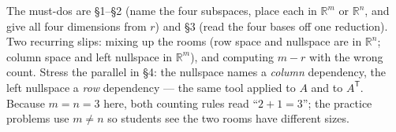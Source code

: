 \documentclass[10pt]{article}
\newcommand{\T}{\mathsf{T}}
\begin{document}
\begin{teachernote}
The must-dos are \S1--\S2 (name the four subspaces, place each in $\mathbb{R}^m$ or $\mathbb{R}^n$, and give
all four dimensions from $r$) and \S3 (read the four bases off one reduction). Two recurring slips: mixing
up the rooms (row space and nullspace are in $\mathbb{R}^n$; column space and left nullspace in
$\mathbb{R}^m$), and computing $m-r$ with the wrong count. Stress the parallel in \S4: the nullspace names a
\emph{column} dependency, the left nullspace a \emph{row} dependency --- the same tool applied to $A$ and to
$A^{\T}$. Because $m=n=3$ here, both counting rules read ``$2+1=3$''; the practice problems use $m\ne n$ so
students see the two rooms have different sizes.
\end{teachernote}
\end{document}
